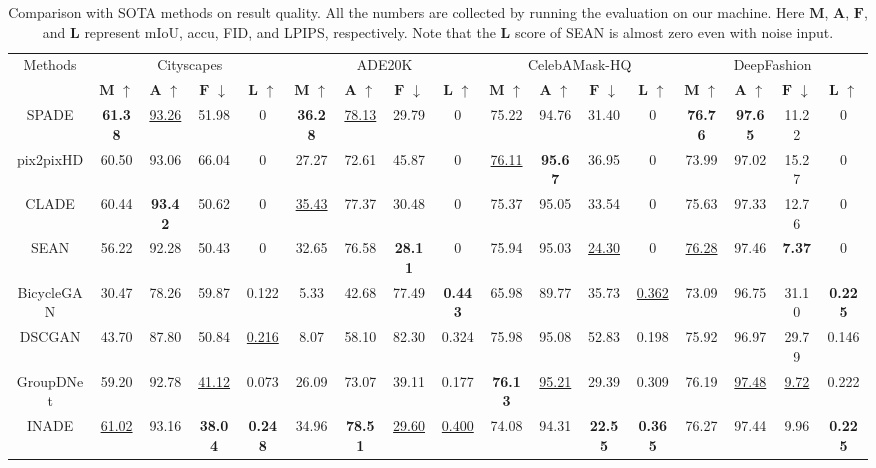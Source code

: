 \documentclass[final]{cvpr}
\begin{document}
\begin{table*}[t]
\setlength{\tabcolsep}{1.6mm}
    \centering
    \caption{Comparison with SOTA methods on result quality. All the numbers are collected by running the evaluation on our machine. Here $\mathbf{M}$, $\mathbf{A}$, $\mathbf{F}$, and $\mathbf{L}$ represent mIoU, accu, FID, and LPIPS, respectively. Note that the $\mathbf{L}$ score of SEAN is almost zero even with noise input.}
\footnotesize
    \begin{tabular}{c|c|c|c|c|c|c|c|c|c|c|c|c|c|c|c|c}
    \hline
        \multirow{2}{*}{Methods} & \multicolumn{4}{c|}{Cityscapes} & \multicolumn{4}{c|}{ADE20K} & \multicolumn{4}{c|}{CelebAMask-HQ} & \multicolumn{4}{c}{DeepFashion}\\
        \cline{2-17}
         & $\mathbf{M}$ $\uparrow$ & $\mathbf{A}$ $\uparrow$ & $\mathbf{F}$ $\downarrow$ & $\mathbf{L}$ $\uparrow$ & $\mathbf{M}$ $\uparrow$ & $\mathbf{A}$ $\uparrow$ & $\mathbf{F}$ $\downarrow$ & $\mathbf{L}$ $\uparrow$ & $\mathbf{M}$ $\uparrow$ & $\mathbf{A}$ $\uparrow$ & $\mathbf{F}$ $\downarrow$ & $\mathbf{L}$ $\uparrow$ & $\mathbf{M}$ $\uparrow$ & $\mathbf{A}$ $\uparrow$ & $\mathbf{F}$ $\downarrow$ & $\mathbf{L}$ $\uparrow$\\
        \hline
        SPADE & \textbf{61.38} & \underline{93.26} & 51.98 & 0 & \textbf{36.28} & \underline{78.13} & 29.79 & 0 & 75.22 & 94.76 & 31.40 & 0 & \textbf{76.76} & \textbf{97.65} & 11.22 & 0\\
        \hline
        pix2pixHD & 60.50 & 93.06 & 66.04 & 0 & 27.27 & 72.61 & 45.87 & 0 & \underline{76.11} & \textbf{95.67} & 36.95 & 0 & 73.99 & 97.02 & 15.27 & 0\\
        \hline
        CLADE & 60.44 & \textbf{93.42} & 50.62 & 0 & \underline{35.43} & 77.37 & 30.48 & 0 & 75.37 & 95.05 & 33.54 & 0 & 75.63 & 97.33 & 12.76 & 0\\
        \hline
        SEAN & 56.22 & 92.28 & 50.43 & 0 & 32.65 & 76.58 & \textbf{28.11} & 0 & 75.94 & 95.03 & \underline{24.30} & 0 & \underline{76.28} & 97.46 & \textbf{7.37} & 0\\
        \hline
        BicycleGAN & 30.47 & 78.26 & 59.87 & 0.122 & 5.33 & 42.68 & 77.49 & \textbf{0.443} & 65.98 & 89.77 & 35.73 & \underline{0.362} & 73.09 & 96.75 & 31.10 & \textbf{0.225}\\
        \hline
        DSCGAN & 43.70 & 87.80 & 50.84 & \underline{0.216} & 8.07 & 58.10 & 82.30 & 0.324 & 75.98 & 95.08 & 52.83 & 0.198 & 75.92 & 96.97 & 29.79 & 0.146\\
        \hline
        GroupDNet & 59.20 & 92.78 & \underline{41.12} & 0.073 & 26.09 & 73.07 & 39.11 & 0.177 & \textbf{76.13} & \underline{95.21} & 29.39 & 0.309 & 76.19 & \underline{97.48} & \underline{9.72} & 0.222\\
        \hline
        INADE & \underline{61.02} & 93.16 & \textbf{38.04} & \textbf{0.248} & 34.96 & \textbf{78.51} & \underline{29.60} & \underline{0.400} & 74.08 & 94.31 & \textbf{22.55} & \textbf{0.365} & 76.27 & 97.44 & 9.96 & \textbf{0.225}\\
        \hline
    \end{tabular}
    \label{tab:comp_quality}
\end{table*}{}
\end{document}
